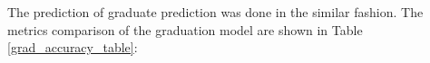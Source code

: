 \documentclass[12pt,english]{report}
\begin{document}

The prediction of graduate prediction was done in the similar fashion. The
metrics comparison of the graduation model are shown in Table
\ref{grad_accuracy_table}:
\end{document}
